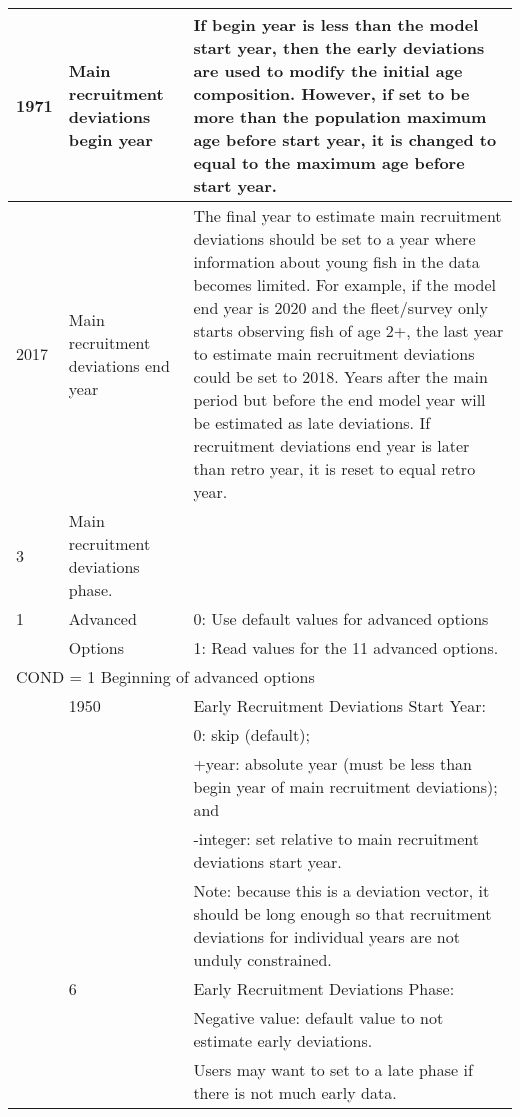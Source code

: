 \begin{longtable}{p{1cm} p{3cm} p{11cm}}
	1971 \Tstrut & Main recruitment deviations begin year & If begin year is less than the model start year, then the early deviations are used to modify the initial age composition. However, if set to be more than the population maximum age before start year, it is changed to equal to the maximum age before start year. \Bstrut\\
	\hline

	2017 \Tstrut & \hypertarget{RecDevEndYear}{Main recruitment deviations end year} & The final year to estimate main recruitment deviations should be set to a year where information about young fish in the data becomes limited. For example, if the model end year is 2020 and the fleet/survey only starts observing fish of age 2+, the last year to estimate main recruitment deviations could be set to 2018. Years after the main period but before the end model year will be estimated as late deviations. If recruitment deviations end year is later than retro year, it is reset to equal retro year. \Bstrut\\
	\hline

	3 \Tstrut & Main recruitment deviations phase. & \Bstrut\\
	\hline

	1 \Tstrut & Advanced & 0: Use default values for advanced options \\
	  & Options & 1: Read values for the 11 advanced options. \Bstrut\\
	\hline

	\multicolumn{3}{l}{COND = 1 Beginning of advanced options} \Tstrut\Bstrut\\
	& 1950 & Early Recruitment Deviations Start Year: \\
	& & 0: skip (default); \\
	& & +year: absolute year (must be less than begin year of main recruitment deviations); and \\
	& & -integer: set relative to main recruitment deviations start year. \\
	& & Note: because this is a deviation vector, it should be long enough so that recruitment deviations for individual years are not unduly constrained. \\

	\Tstrut & 6 & Early Recruitment Deviations Phase: \\
	& & Negative value: default value to not estimate early deviations. \\
	& & Users may want to set to a late phase if there is not much early data. \\
	

\end{longtable}
